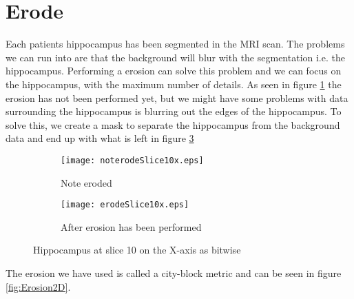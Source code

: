 \section{Erode}

Each patients hippocampus has been segmented in the MRI scan. The problems we can run into are that the background will blur with the segmentation i.e. the hippocampus. Performing a erosion can solve this problem and we can focus on the hippocampus, with the maximum number of details. As seen in figure \ref{fig:noterodeslice} the erosion has not been performed yet, but we might have some problems with data surrounding the hippocampus is blurring out the edges of the hippocampus. To solve this, we create a mask to separate the hippocampus from the background data and end up with what is left in figure \ref{fig:erodeslice}

\begin{figure}[H]
    \begin{subfigure}{.5\textwidth}
      \centering
      \texttt{[image: noterodeSlice10x.eps]}
      \caption{Note eroded}\label{fig:noterodeslice}
    \end{subfigure}
    \begin{subfigure}{.5\textwidth}
      \centering
      \texttt{[image: erodeSlice10x.eps]}
      \caption{After erosion has been performed}\label{fig:erodeslice}
    \end{subfigure}
    \caption{Hippocampus at slice 10 on the X-axis as bitwise}
\end{figure}

The erosion we have used is called a city-block metric and can be seen in figure \ref{fig:Erosion2D}.

